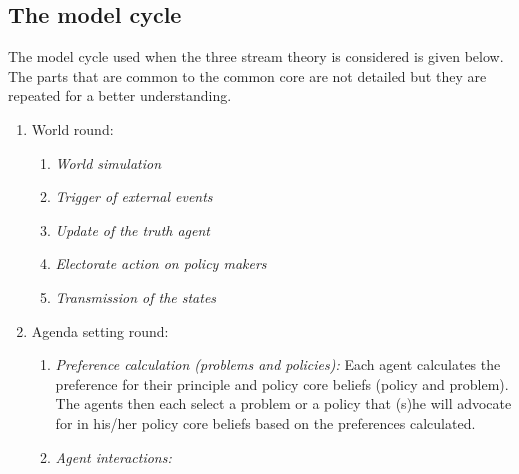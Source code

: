\subsection{The model cycle}

The model cycle used when the three stream theory is considered is given below. The parts that are common to the common core are not detailed but they are repeated for a better understanding.

\begin{enumerate}
\item World round:
	
	\begin{enumerate}
	\item \emph{World simulation}
	\item \emph{Trigger of external events}
	\item \emph{Update of the truth agent}
	\item \emph{Electorate action on policy makers}
	\item \emph{Transmission of the states}
	\end{enumerate}
	
\item Agenda setting round:

	\begin{enumerate}
	\item \emph{Preference calculation (problems and policies):} Each agent calculates the preference for their principle and policy core beliefs (policy and problem). The agents then each select a problem or a policy that (s)he will advocate for in his/her policy core beliefs based on the preferences calculated.
	\item \emph{Agent interactions:} 


\end{enumerate}
\end{enumerate}
